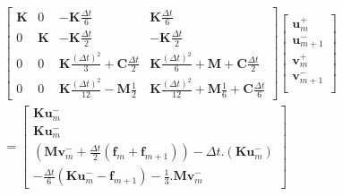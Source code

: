 \documentclass[12pt,a4paper]{report}
\begin{document}
\begin{equation}
\begin{array}{c}
		\begin{bmatrix}   
		   		\mathbf{K}
			&
		   		0
		   	&
			   	-\mathbf{K} \frac{\Delta t}{6} 
		   	&
		   		\mathbf{K} \frac{\Delta t}{6} 
		\\ 	     
			   0 
			&
				\mathbf{K} 
		   	&
		   		-\mathbf{K} \frac{\Delta t}{2} 
		   	&
		   		-\mathbf{K} \frac{\Delta t}{2}
		\\   
		   		0
		   	& 
		   		0
		   	&
			   	\mathbf{K}
			   		\frac{(\Delta t)^2}{3} 
		   		+\mathbf{C} \frac{\Delta t}{2}
		   	&
		   		\mathbf{K} \frac{(\Delta t)^2}{6} 
		   		+\mathbf{M} 
			   	+\mathbf{C} \frac{\Delta t}{2}
		\\    
		   		0
		   	&
		   		0
		   	&
		   		\mathbf{K} \frac{(\Delta t)^2}{12}
		   		-\mathbf{M}
			   		\frac{1}{2} 
		   	&
		   		\mathbf{K} \frac{(\Delta t)^2}{12}
		   		+\mathbf{M} \frac{1}{6} 
			   +\mathbf{C} \frac{\Delta t}{6} 
	\end{bmatrix}
	\begin{bmatrix}
		   \mathbf{u}_m^+  		\\
		   \mathbf{u}_{m+1}^-  	\\
		   \mathbf{v}_m^+  		\\
		   \mathbf{v}_{m+1}^-  	\\
	\end{bmatrix}
	\\ =
	\begin{bmatrix}	
		  \mathbf{K} \mathbf{u}_m^-
		\\ \mathbf{K} \mathbf{u}_m^-
		\\ 	\left( \mathbf{M} \mathbf{v}_m^-
		     			+\frac{\Delta t}{2}  (\mathbf{f}_m + \mathbf{f}_{m+1})
			  \right)
			-\Delta t.
			 \left( \mathbf{K} \mathbf{u}_m^-
			  \right)
		\\-\frac{\Delta t}{6}
				\left( \mathbf{K} \mathbf{u}_m^- 
						-\mathbf{f}_{m+1}
				\right)
					  
			- \frac{1}{3} .  \mathbf{M} \mathbf{v}_m^-
	\end{bmatrix}
\end{array}
\end{equation}
\end{document}
